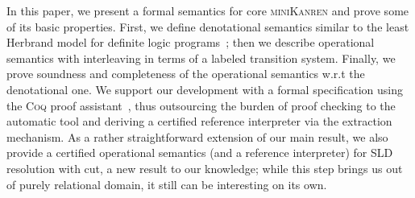 In this paper, we present a formal semantics for core \textsc{miniKanren} and prove some of its basic properties. First,
we define denotational semantics similar to the least Herbrand model for definite logic programs~\cite{LHM}; then
we describe operational semantics with interleaving in terms of a labeled transition system. Finally, we prove soundness and
completeness of the operational semantics w.r.t the denotational one. We support our development with a formal specification
using the \textsc{Coq} proof assistant~\cite{Coq}, thus outsourcing the burden of proof checking to the automatic tool and
deriving a certified reference interpreter via the extraction mechanism. As a rather straightforward extension of our
main result, we also provide a certified operational semantics (and a reference interpreter) for SLD resolution with cut, a new result
to our knowledge; while this step brings us out of purely relational domain, it still can be interesting on its own.
